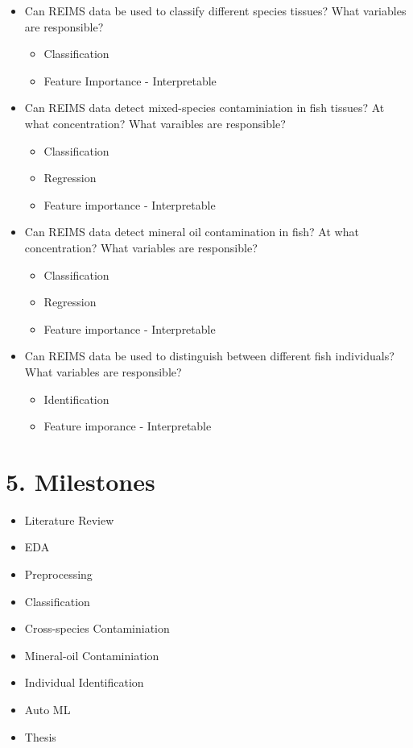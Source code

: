 \documentclass[11pt, a4paper, twoside, openright]{report}
\begin{document}
\begin{itemize}
  \item Can REIMS data be used to classify different species tissues? What variables are responsible?
  \begin{itemize}
    \item Classification 
    \item Feature Importance - Interpretable 
  \end{itemize}
  \item Can REIMS data detect mixed-species contaminiation in fish tissues? At what concentration? What varaibles are responsible? 
  \begin{itemize}
    \item Classification 
    \item Regression 
    \item Feature importance - Interpretable
  \end{itemize}
  \item Can REIMS data detect mineral oil contamination in fish? At what concentration? What variables are responsible?
  \begin{itemize}
    \item Classification 
    \item Regression 
    \item Feature importance - Interpretable 
  \end{itemize}
  \item Can REIMS data be used to distinguish between different fish individuals? What variables are responsible?
  \begin{itemize}
    \item Identification 
    \item Feature imporance - Interpretable 
  \end{itemize}
\end{itemize}

\section*{5. Milestones}

\begin{itemize}
  \item Literature Review 
  \item EDA 
  \item Preprocessing 
  \item Classification 
  \item Cross-species Contaminiation 
  \item Mineral-oil Contaminiation  
  \item Individual Identification 
  \item Auto ML 
  \item Thesis 
\end{itemize}
\end{document}
